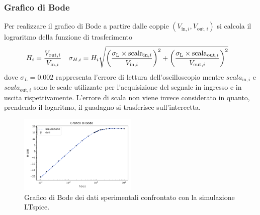 \documentclass[a4paper,11pt]{article}
\begin{document}
\subsubsection{Grafico di Bode}
\label{sec:grafico-di-bode}

Per realizzare il grafico di Bode a partire dalle coppie $(V_{\text{in},i}, V_{\text{out},i})$ si
calcola il lograritmo della funzione di trasferimento
\begin{align}
  \label{eq:3}
  H_{i} &=\frac{V_{\text{out},i}}{V_{\text{in},i}}
  &
    \sigma_{H,i} &= H_{i}\sqrt{ \left(\frac{\sigma_{\text L} \times \text{scala}_{\text{in},i}}{V_{\text{in},i}} \right)^{2} +
                 \left( \frac{\sigma_{\text L} \times \text{scala}_{\text{out},i}}{V_{\text{out},i}} \right)^{2}}
\end{align}
dove $\sigma_{L}=0.002$ rappresenta l'errore di lettura dell'oscilloscopio mentre $scala_{\text{in},i}$ e $scala_{\text{out},i}$ sono le
scale utilizzate per l'acquisizione del segnale in ingresso e in uscita rispettivamente. L'errore di scala
non viene invece considerato in quanto, prendendo il logaritmo, il guadagno si trasferisce sull'intercetta.

\begin{figure}
\centering
\includegraphics[width=0.5\textwidth]{images/grafico_bodeSim}
\caption{\footnotesize Grafico di Bode dei dati sperimentali confrontato con la simulazione LTspice.}
\label{fig:graf_bode}
 \vspace{-10pt} %
\end{figure}
\end{document}
